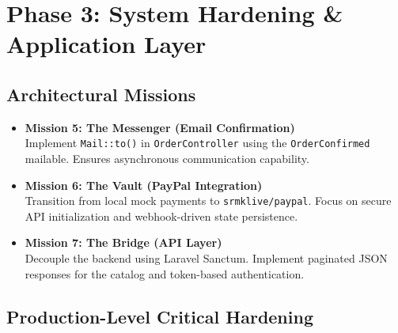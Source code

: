 \section{Phase 3: System Hardening \& Application Layer}

\subsection{Architectural Missions}

\begin{itemize}
    \item \textbf{Mission 5: The Messenger (Email Confirmation)} \\
    Implement \texttt{Mail::to()} in \texttt{OrderController} using the \texttt{OrderConfirmed} mailable. Ensures asynchronous communication capability.
    
    \item \textbf{Mission 6: The Vault (PayPal Integration)} \\
    Transition from local mock payments to \texttt{srmklive/paypal}. Focus on secure API initialization and webhook-driven state persistence.
    
    \item \textbf{Mission 7: The Bridge (API Layer)} \\
    Decouple the backend using Laravel Sanctum. Implement paginated JSON responses for the catalog and token-based authentication.
\end{itemize}

\subsection{Production-Level Critical Hardening}

